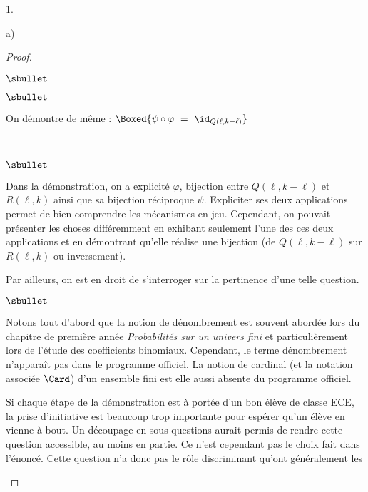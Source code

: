 \begin{noliste}{1.}
\begin{noliste}{a)}
\begin{proof}
\begin{noliste}{$\sbullet$}
\begin{noliste}{$\sbullet$}
        \item On démontre de même : $\Boxed{\psi \circ \varphi \ = \
          \id_{Q(\ell, k-\ell)}}$\\[-.6cm]
        \end{noliste}        
      \end{noliste}  
      ~\\[-.8cm]
      \begin{remarkL}{.98}%
        \begin{noliste}{$\sbullet$}
        \item Dans la démonstration, on a explicité $\varphi$,
          bijection entre $Q(\ell, k - \ell)$ et $R(\ell, k)$ ainsi
          que sa bijection réciproque $\psi$. Expliciter ses deux
          applications permet de bien comprendre les mécanismes en
          jeu. Cependant, on pouvait présenter les choses différemment
          en exhibant seulement l'une des ces deux applications et en
          démontrant qu'elle réalise une bijection (de $Q(\ell, k -
          \ell)$ sur $R(\ell, k)$ ou inversement).
        \end{noliste}
        Par ailleurs, on est en droit de s'interroger sur la
        pertinence d'une telle question.
        \begin{noliste}{$\sbullet$}
        \item Notons tout d'abord que la notion de dénombrement est
          souvent abordée lors du chapitre de première année {\it
            Probabilités sur un univers fini} et particulièrement lors
          de l'étude des coefficients binomiaux. Cependant, le terme
          \og dénombrement \fg{} n'apparaît pas dans le programme
          officiel. La notion de cardinal (et la notation associée
          $\Card$) d'un ensemble fini est elle aussi absente du
          programme officiel.
        \item Si chaque étape de la démonstration est à portée d'un
          bon élève de classe ECE, la prise d'initiative est beaucoup
          trop importante pour espérer qu'un élève en vienne à
          bout. Un découpage en sous-questions aurait permis de rendre
          cette question accessible, au moins en partie. Ce n'est
          cependant pas le choix fait dans l'énoncé. Cette question
          n'a donc pas le rôle discriminant qu'ont généralement les

\end{noliste}
\end{remarkL}
\end{proof}
\end{noliste}
\end{noliste}
